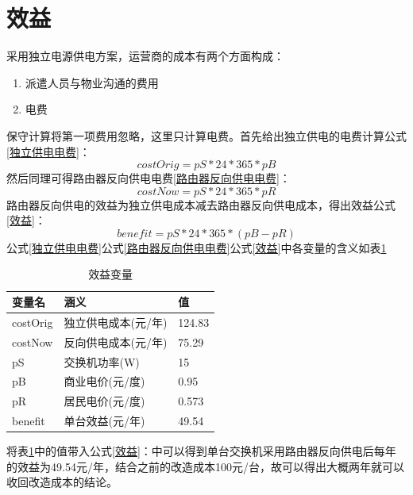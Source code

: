 \documentclass[12pt,a4paper]{report}
\begin{document}
\section{效益}
采用独立电源供电方案，运营商的成本有两个方面构成：
\begin{enumerate}
    \item 派遣人员与物业沟通的费用
    \item 电费
\end{enumerate}
保守计算将第一项费用忽略，这里只计算电费。首先给出独立供电的电费计算公式\ref{独立供电电费}：
\begin{equation}
    costOrig = pS * 24 * 365 * pB
    \label{独立供电电费}
\end{equation}
然后同理可得路由器反向供电电费\ref{路由器反向供电电费}：
\begin{equation}
    costNow = pS * 24 * 365 * pR
    \label{路由器反向供电电费}
\end{equation}
路由器反向供电的效益为独立供电成本减去路由器反向供电成本，得出效益公式\ref{效益}：
\begin{equation}
    benefit = pS * 24 * 365 * (pB - pR)
    \label{效益}
\end{equation}
公式\ref{独立供电电费}公式\ref{路由器反向供电电费}公式\ref{效益}中各变量的含义如表\ref{效益变量}
\begin{table}[!hbp]
    \begin{center}
        \begin{tabular}{|l|l|l|}
            \hline
            变量名 & 涵义 & 值 \\
            \hline
            costOrig & 独立供电成本(元/年) & 124.83 \\
            \hline
            costNow & 反向供电成本(元/年) & 75.29 \\
            \hline
            pS & 交换机功率(W) & 15 \\
            \hline
            pB & 商业电价(元/度) & 0.95 \\
            \hline
            pR & 居民电价(元/度) & 0.573 \\
            \hline
            benefit & 单台效益(元/年) &  49.54 \\
            \hline
        \end{tabular}
        \caption{效益变量\label{效益变量}}
    \end{center}
\end{table}
将表\ref{效益变量}中的值带入公式\ref{效益}：中可以得到单台交换机采用路由器反向供电后每年的效益为49.54元/年，结合之前的改造成本100元/台，故可以得出大概两年就可以收回改造成本的结论。
\end{document}
